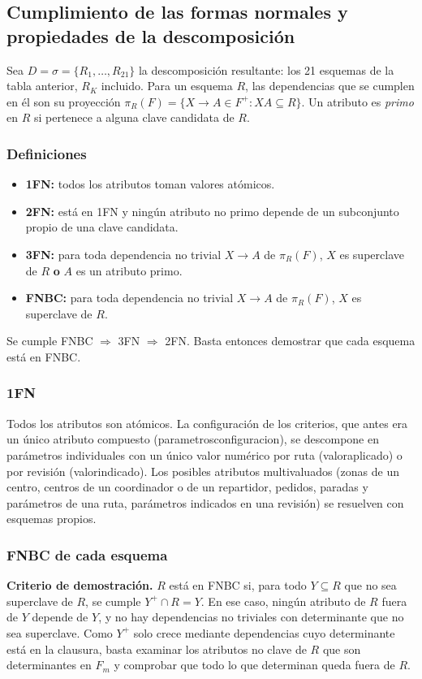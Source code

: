 \documentclass[11pt,a4paper]{article}
\newcommand{\ubrk}{\textunderscore\allowbreak}
\newcommand{\campo}[1]{\textnormal{\ttfamily\let\_\ubrk #1}}
\begin{document}
\subsection{Cumplimiento de las formas normales y propiedades de la descomposición}\label{sec:fn}

Sea $D = \sigma = \{R_1, \dots, R_{21}\}$ la descomposición resultante: los 21 esquemas de la tabla anterior, $R_K$ incluido. Para un esquema $R$, las dependencias que se cumplen en él son su proyección $\pi_R(F) = \{X \rightarrow A \in F^+ : XA \subseteq R\}$. Un atributo es \emph{primo} en $R$ si pertenece a alguna clave candidata de $R$.

\subsubsection*{Definiciones}
\begin{itemize}
\item \textbf{1FN:} todos los atributos toman valores atómicos.
\item \textbf{2FN:} está en 1FN y ningún atributo no primo depende de un subconjunto propio de una clave candidata.
\item \textbf{3FN:} para toda dependencia no trivial $X \rightarrow A$ de $\pi_R(F)$, $X$ es superclave de $R$ \textbf{o} $A$ es un atributo primo.
\item \textbf{FNBC:} para toda dependencia no trivial $X \rightarrow A$ de $\pi_R(F)$, $X$ es superclave de $R$.
\end{itemize}
Se cumple FNBC $\Rightarrow$ 3FN $\Rightarrow$ 2FN. Basta entonces demostrar que cada esquema está en FNBC.

\subsubsection*{1FN}
Todos los atributos son atómicos. La configuración de los criterios, que antes era un único atributo compuesto (\campo{parametros\_configuracion}), se descompone en parámetros individuales con un único valor numérico por ruta (\campo{valor\_aplicado}) o por revisión (\campo{valor\_indicado}). Los posibles atributos multivaluados (zonas de un centro, centros de un coordinador o de un repartidor, pedidos, paradas y parámetros de una ruta, parámetros indicados en una revisión) se resuelven con esquemas propios.

\subsubsection*{FNBC de cada esquema}
\textbf{Criterio de demostración.} $R$ está en FNBC si, para todo $Y \subseteq R$ que no sea superclave de $R$, se cumple $Y^+ \cap R = Y$. En ese caso, ningún atributo de $R$ fuera de $Y$ depende de $Y$, y no hay dependencias no triviales con determinante que no sea superclave. Como $Y^+$ solo crece mediante dependencias cuyo determinante está en la clausura, basta examinar los atributos no clave de $R$ que son determinantes en $F_m$ y comprobar que todo lo que determinan queda fuera de $R$.
\end{document}
